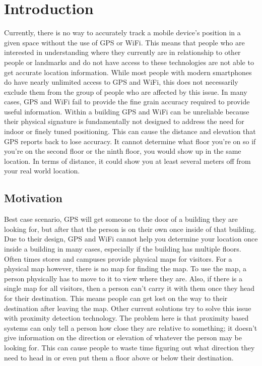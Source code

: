 \chapter{Introduction}
Currently, there is no way to accurately track a mobile device’s position in a given space without the use of GPS or WiFi.
This means that people who are interested in understanding where they currently are in relationship to other people or landmarks and do
not have access to these technologies are not able to get accurate location information.
While most people with modern smartphones do have nearly unlimited access to GPS and WiFi, this does not necessarily exclude them
from the group of people who are affected by this issue.  In many cases, GPS and WiFi fail to provide the fine grain accuracy required
to provide useful information.  Within a building GPS and WiFi can be unreliable because their physical signature is fundamentally not
designed to address the need for indoor or finely tuned positioning. This can cause the distance and elevation that GPS reports back to
lose accuracy. It cannot determine what floor you’re on so if you’re on the second floor or the ninth floor, you would show up in the
same location. In terms of distance, it could show you at least several meters off from your real world location.

\section{Motivation}

Best case scenario, GPS will get someone to the door of a building they are looking for, but after that the person is on their own once
inside of that building. Due to their design, GPS and WiFi cannot help you determine your location once inside a building in many cases,
especially if the building has multiple floors. Often times stores and campuses provide physical maps for visitors. For a physical map
however, there is no map for finding the map. To use the map, a person physically has to move to it to view where they are. Also, if
there is a single map for all visitors, then a person can’t carry it with them once they head for their destination. This means people
can get lost on the way to their destination after leaving the map. Other current solutions try to solve this issue with proximity
detection technology. The problem here is that proximity based systems can only tell a person how close they are relative to something;
it doesn’t give information on the direction or elevation of whatever the person may be looking for. This can cause people to waste time
figuring out what direction they need to head in or even put them a floor above or below their destination.

